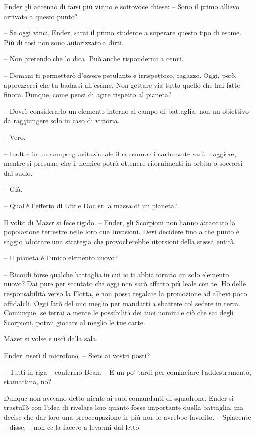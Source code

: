 {Ender gli accennò di farsi più vicino e sottovoce chiese: -- Sono il
	primo allievo arrivato a questo punto?}

{-- Se oggi vinci, Ender, sarai il primo studente a superare questo tipo
	di esame. Più di così non sono autorizzato a dirti.}

{-- Non pretendo che lo dica. Può anche rispondermi a cenni.}

{-- Domani ti permetterò d'essere petulante e irrispettoso, ragazzo.
	Oggi, però, apprezzerei che tu badassi all'esame. Non gettare via tutto
	quello che hai fatto finora. Dunque, come pensi di agire rispetto al
	pianeta?}

{-- Dovrò considerarlo un elemento interno al campo di battaglia, non un
	obiettivo da raggiungere solo in caso di vittoria.}

{-- Vero.}

{-- Inoltre in un campo gravitazionale il consumo di carburante sarà
	maggiore, mentre si presume che il nemico potrà ottenere rifornimenti in
	orbita o soccorsi dal suolo.}

{-- Già.}

{-- Qual è l'effetto di Little Doc sulla massa di un pianeta?}

{Il volto di Mazer si fece rigido. -- Ender, gli Scorpioni non hanno
	attaccato la popolazione terrestre nelle loro due Invasioni. Devi
	decidere fino a che punto è saggio adottare una strategia che
	provocherebbe ritorsioni della stessa entità.}

{-- Il pianeta è l'unico elemento nuovo?}

{-- Ricordi forse qualche battaglia in cui io ti abbia fornito un solo
	elemento nuovo? Dai pure per scontato che oggi non sarò affatto più
	leale con te. Ho delle responsabilità verso la Flotta, e non posso
	regalare la promozione ad allievi poco affidabili. Oggi farò del mio
	meglio per mandarti a sbattere col sedere in terra. Comunque, se terrai
	a mente le possibilità dei tuoi uomini e ciò che sai degli Scorpioni,
	potrai giocare al meglio le tue carte.}

{Mazer si volse e uscì dalla sala.}

{Ender inserì il microfono. -- Siete ai vostri posti?}

{-- Tutti in riga -- confermò Bean. -- È un po' tardi per cominciare
	l'addestramento, stamattina, no?}

{Dunque non avevano detto niente ai suoi comandanti di squadrone. Ender
	si trastullò con l'idea di rivelare loro quanto fosse importante quella
	battaglia, ma decise che dar loro una preoccupazione in più non lo
	avrebbe favorito. -- Spiacente -- disse, -- non ce la facevo a levarmi
	dal letto.}


